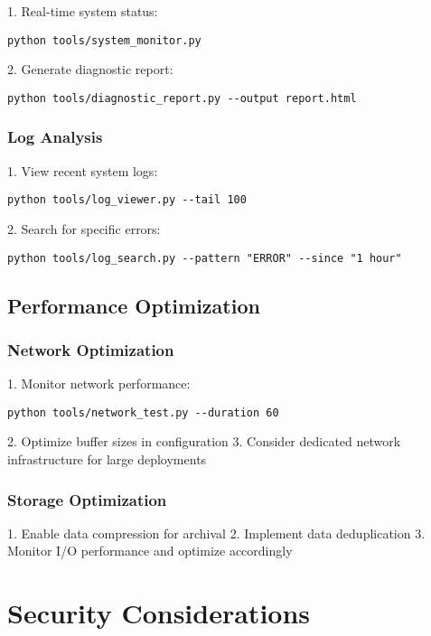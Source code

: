 1. Real-time system status:
\begin{verbatim}
python tools/system_monitor.py
\end{verbatim}

2. Generate diagnostic report:
\begin{verbatim}
python tools/diagnostic_report.py --output report.html
\end{verbatim}

\subsubsection{Log Analysis}

1. View recent system logs:
\begin{verbatim}
python tools/log_viewer.py --tail 100
\end{verbatim}

2. Search for specific errors:
\begin{verbatim}
python tools/log_search.py --pattern "ERROR" --since "1 hour"
\end{verbatim}

\subsection{Performance Optimization}

\subsubsection{Network Optimization}

1. Monitor network performance:
\begin{verbatim}
python tools/network_test.py --duration 60
\end{verbatim}

2. Optimize buffer sizes in configuration
3. Consider dedicated network infrastructure for large deployments

\subsubsection{Storage Optimization}

1. Enable data compression for archival
2. Implement data deduplication
3. Monitor I/O performance and optimize accordingly

\section{Security Considerations}


